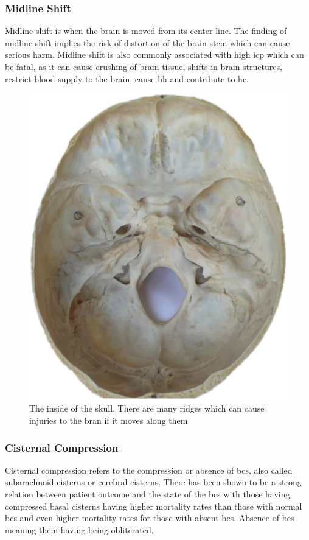 \documentclass[11pt]{article}
\begin{document}
\subsubsection{Midline Shift}
Midline shift is when the brain is moved from its center line. The finding of midline shift implies the risk of distortion of the brain stem which can cause serious harm. Midline shift is also commonly associated with high \gls{icp} which can be fatal, as it can cause crushing of brain tissue, shifts in brain structures, restrict blood supply to the brain, cause \gls{bh} and contribute to \gls{hc}\cite{IntracranialPressure2021}.\cite{MidlineShift2021}

\begin{figure}[ht]
  \centering
  \includegraphics[width=12cm]{graphics/skull_interior.jpeg}
  \caption{The inside of the skull. There are many ridges which can cause injuries to the bran if it moves along them.}
\end{figure}

\subsubsection{Cisternal Compression}
Cisternal compression refers to the compression or absence of \glspl{bc}, also called subarachnoid cisterns or cerebral cisterns. There has been shown to be a strong relation between patient outcome and the state of the \glspl{bc} with those having compressed basal cisterns having higher mortality rates than those with normal \glspl{bc} and even higher mortality rates for those with absent \glspl{bc}\cite{toutantAbsentCompressedBasal1984}\cite{kouvarellisRelationshipBasalCisterns2011}. Absence of \glspl{bc} meaning them having being obliterated\cite{kouvarellisRelationshipBasalCisterns2011}.
\end{document}
